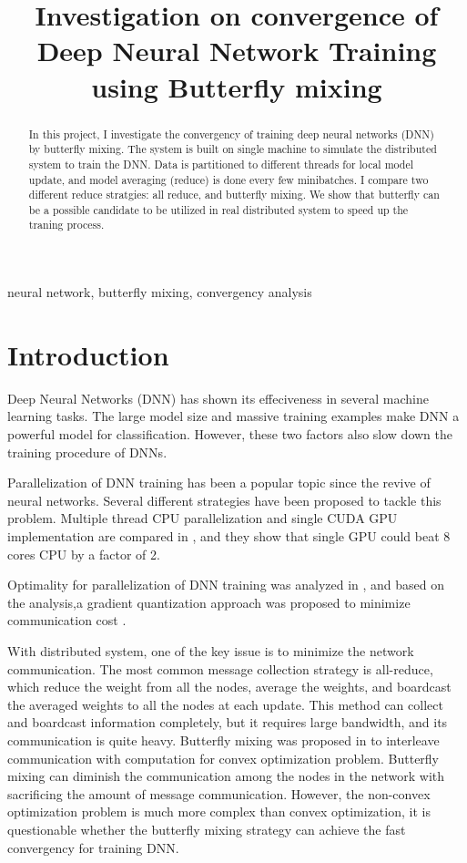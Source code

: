 \documentclass{article}
\title{Investigation on convergence of Deep Neural Network Training using Butterfly mixing}
\begin{document}
%
\maketitle
%
\begin{abstract}
In this project, I investigate the convergency of training deep neural networks (DNN) by butterfly mixing. The system is built on single machine to simulate the distributed system to train the DNN. Data is partitioned to different threads for local model update, and model averaging (reduce) is done every few minibatches. I compare two different reduce stratgies: all reduce, and butterfly mixing. We show that butterfly can be a possible candidate to be utilized in real distributed system to speed up the traning process.

\end{abstract}
%
\begin{keywords}
neural network, butterfly mixing, convergency analysis
\end{keywords}
%
\section{Introduction}
\label{sec:intro}

Deep Neural Networks (DNN) has shown its effeciveness in several machine learning tasks. The large model size and massive training examples make DNN a powerful model for classification. However, these two factors also slow down the training procedure of DNNs.

Parallelization of DNN training has been a popular topic since the revive of neural networks. Several different strategies have been proposed to tackle this problem. Multiple thread CPU parallelization and single CUDA GPU implementation are compared in \cite{scanzio2010parallel,vesely2010parallel}, and they show that single GPU could beat 8 cores CPU by a factor of 2.

Optimality for parallelization of DNN training was analyzed in \cite{seide2014parallelizability}, and based on the analysis,a gradient quantization approach was proposed to minimize communication cost \cite{seide20141}.

With distributed system, one of the key issue is to minimize the network communication. The most common message collection strategy is all-reduce, which reduce the weight from all the nodes, average the weights, and boardcast the averaged weights to all the nodes at each update. This method can collect and boardcast information completely, but it requires large bandwidth, and its communication is quite heavy. Butterfly mixing was proposed in \cite{zhao2013butterfly} to interleave communication with computation for convex optimization problem. Butterfly mixing can diminish the communication among the nodes in the network with sacrificing the amount of message communication. However, the non-convex optimization problem is much more complex than convex optimization, it is questionable whether the butterfly mixing strategy can achieve the fast convergency for training DNN.
\end{document}

